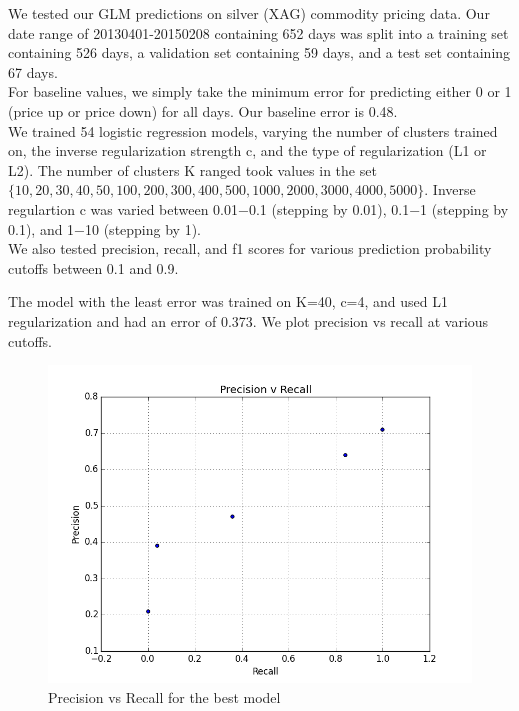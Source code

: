 We tested our GLM predictions on silver (XAG) commodity pricing data. Our date range of 20130401-20150208 containing 652 days was split into a training set containing 526 days, a validation set containing 59 days, and a test set containing 67 days.\\

For baseline values, we simply take the minimum error for predicting either 0 or 1 (price up or price down) for all days. Our baseline error is 0.48.\\

We trained 54 logistic regression models, varying the number of clusters trained on, the inverse regularization strength c, and the type of regularization (L1 or L2). The number of clusters K ranged took values in the set $\{10,20,30,40,50,100,200,300,400,500,1000,2000,3000,4000,5000\}$. Inverse regulartion c was varied between 0.01−0.1 (stepping by 0.01), 0.1−1 (stepping by 0.1), and 1−10 (stepping by 1).\\

We also tested precision, recall, and f1 scores for various prediction probability cutoffs between 0.1 and 0.9.

The model with the least error was trained on K=40, c=4, and used L1 regularization and had an error of 0.373. We plot precision vs recall at various cutoffs. 

\begin{figure}[ht]
\vskip 0.2in
\begin{center}
\centerline{\includegraphics[scale=0.15]{images/precision_v_recall.png}}
\caption{Precision vs Recall for the best model}
\end{center}
\vskip -0.2in
\label{fig:precision_v_recall}
\end{figure} 


